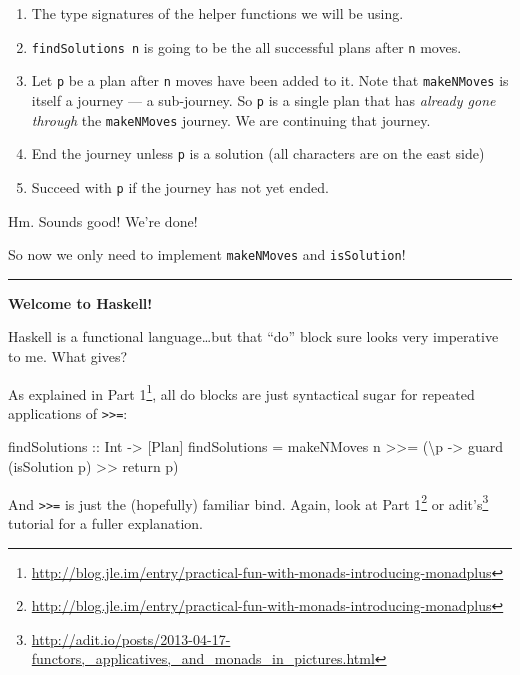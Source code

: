 \documentclass[]{article}
\newenvironment{Shaded}{}{}
\newcommand{\DataTypeTok}[1]{\textcolor[rgb]{0.56,0.13,0.00}{#1}}
\newcommand{\FunctionTok}[1]{\textcolor[rgb]{0.02,0.16,0.49}{#1}}
\newcommand{\NormalTok}[1]{#1}
\newcommand{\OtherTok}[1]{\textcolor[rgb]{0.00,0.44,0.13}{#1}}
\renewcommand{\href}[2]{#2\footnote{\url{#1}}}
\begin{document}
\begin{enumerate}
\def\labelenumi{\arabic{enumi}.}
\tightlist
\item
  The type signatures of the helper functions we will be using.
\item
  \texttt{findSolutions\ n} is going to be the all successful plans after
  \texttt{n} moves.
\item
  Let \texttt{p} be a plan after \texttt{n} moves have been added to it. Note
  that \texttt{makeNMoves} is itself a journey --- a sub-journey. So \texttt{p}
  is a single plan that has \emph{already gone through} the \texttt{makeNMoves}
  journey. We are continuing that journey.
\item
  End the journey unless \texttt{p} is a solution (all characters are on the
  east side)
\item
  Succeed with \texttt{p} if the journey has not yet ended.
\end{enumerate}

Hm. Sounds good! We're done!

So now we only need to implement \texttt{makeNMoves} and \texttt{isSolution}!

\begin{center}\rule{0.5\linewidth}{\linethickness}\end{center}

\textbf{Welcome to Haskell!}

Haskell is a functional language\ldots{}but that ``do'' block sure looks very
imperative to me. What gives?

As explained in
\href{http://blog.jle.im/entry/practical-fun-with-monads-introducing-monadplus}{Part
1}, all do blocks are just syntactical sugar for repeated applications of
\texttt{\textgreater{}\textgreater{}=}:

\begin{Shaded}
\begin{Highlighting}[]
\OtherTok{findSolutions ::} \DataTypeTok{Int} \OtherTok{->}\NormalTok{ [}\DataTypeTok{Plan}\NormalTok{]}
\NormalTok{findSolutions }\FunctionTok{=}
\NormalTok{    makeNMoves n }\FunctionTok{>>=}\NormalTok{ (\textbackslash{}p }\OtherTok{->}\NormalTok{ guard (isSolution p) }\FunctionTok{>>}\NormalTok{ return p)}
\end{Highlighting}
\end{Shaded}

And \texttt{\textgreater{}\textgreater{}=} is just the (hopefully) familiar
bind. Again, look at
\href{http://blog.jle.im/entry/practical-fun-with-monads-introducing-monadplus}{Part
1} or
\href{http://adit.io/posts/2013-04-17-functors,_applicatives,_and_monads_in_pictures.html}{adit's}
tutorial for a fuller explanation.
\end{document}
